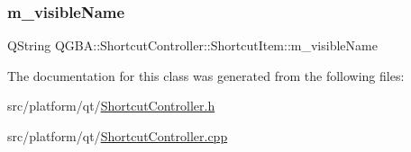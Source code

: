 \subsubsection{\texorpdfstring{m\+\_\+visible\+Name}{m\_visibleName}}
{\footnotesize\ttfamily Q\+String Q\+G\+B\+A\+::\+Shortcut\+Controller\+::\+Shortcut\+Item\+::m\+\_\+visible\+Name\hspace{0.3cm}{\ttfamily [private]}}



The documentation for this class was generated from the following files\+:\begin{DoxyCompactItemize}
\item 
src/platform/qt/\mbox{\hyperlink{_shortcut_controller_8h}{Shortcut\+Controller.\+h}}\item 
src/platform/qt/\mbox{\hyperlink{_shortcut_controller_8cpp}{Shortcut\+Controller.\+cpp}}\end{DoxyCompactItemize}
